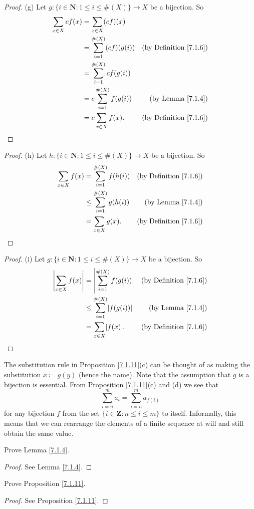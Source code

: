 \begin{proof}{(g)}
Let \(g : \{i \in \mathbf{N} : 1 \leq i \leq \#(X)\} \to X\) be a bijection.
So
\begin{align*}
\sum_{x \in X} cf(x) &= \sum_{x \in X} (cf)(x) \\
&= \sum_{i = 1}^{\#(X)} (cf)(g(i)) & \text{(by Definition \ref{7.1.6})} \\
&= \sum_{i = 1}^{\#(X)} cf(g(i)) \\
&= c\sum_{i = 1}^{\#(X)} f(g(i)) & \text{(by Lemma \ref{7.1.4})} \\
&= c\sum_{x \in X} f(x). & \text{(by Definition \ref{7.1.6})}
\end{align*}
\end{proof}

\begin{proof}{(h)}
Let \(h : \{i \in \mathbf{N} : 1 \leq i \leq \#(X)\} \to X\) be a bijection.
So
\begin{align*}
\sum_{x \in X} f(x) &= \sum_{i = 1}^{\#(X)} f(h(i)) & \text{(by Definition \ref{7.1.6})} \\
&\leq \sum_{i = 1}^{\#(X)} g(h(i)) & \text{(by Lemma \ref{7.1.4})} \\
&= \sum_{x \in X} g(x). & \text{(by Definition \ref{7.1.6})}
\end{align*}
\end{proof}

\begin{proof}{(i)}
Let \(g : \{i \in \mathbf{N} : 1 \leq i \leq \#(X)\} \to X\) be a bijection.
So
\begin{align*}
\abs*{\sum_{x \in X} f(x)} &= \abs*{\sum_{i = 1}^{\#(X)} f(g(i))} & \text{(by Definition \ref{7.1.6})} \\
&\leq \sum_{i = 1}^{\#(X)} \abs*{f(g(i))} & \text{(by Lemma \ref{7.1.4})} \\
&= \sum_{x \in X} \abs*{f(x)}. & \text{(by Definition \ref{7.1.6})}
\end{align*}
\end{proof}

\begin{remark}\label{7.1.12}
The substitution rule in Proposition \ref{7.1.11}(c) can be thought of as making the substitution \(x \coloneqq g(y)\) (hence the name).
Note that the assumption that \(g\) is a bijection is essential.
From Proposition \ref{7.1.11}(c) and (d) we see that
\[
    \sum_{i = n}^m a_i = \sum_{i = n}^m a_{f(i)}
\]
for any bijection \(f\) from the set \(\{i \in \mathbf{Z} : n \leq i \leq m\}\) to itself.
Informally, this means that we can rearrange the elements of a finite sequence at will and still obtain the same value.
\end{remark}

\exercisesection

\begin{exercise}\label{ex 7.1.1}
Prove Lemma \ref{7.1.4}.
\end{exercise}

\begin{proof}
See Lemma \ref{7.1.4}.
\end{proof}

\begin{exercise}\label{ex 7.1.2}
Prove Proposition \ref{7.1.11}.
\end{exercise}

\begin{proof}
See Proposition \ref{7.1.11}.
\end{proof}